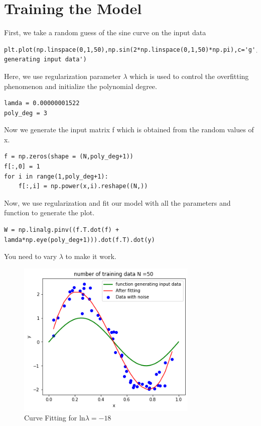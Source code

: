 \documentclass[journal,12pt,twocolumn]{IEEEtran}
\begin{document}
\section{Training the Model}
First, we take a random guess of the sine curve on the input data
\begin{lstlisting}
plt.plot(np.linspace(0,1,50),np.sin(2*np.linspace(0,1,50)*np.pi),c='g',linewidth=2,label='function generating input data')
\end{lstlisting} 
Here, we use regularization parameter $\lambda$ which is used to control the overfitting phenomenon and initialize the polynomial degree. 
\begin{lstlisting}
lamda = 0.00000001522 
poly_deg = 3
\end{lstlisting}
Now we generate the input matrix f which is obtained from the random values of x.
\begin{lstlisting}
f = np.zeros(shape = (N,poly_deg+1))
f[:,0] = 1
for i in range(1,poly_deg+1):
    f[:,i] = np.power(x,i).reshape((N,))    
\end{lstlisting}
Now, we use regularization and fit our model with all the parameters and function to generate the plot.
\begin{lstlisting}
W = np.linalg.pinv((f.T.dot(f) + lamda*np.eye(poly_deg+1))).dot(f.T).dot(y)
\end{lstlisting}
You need to vary $\lambda$ to make it work.
\begin{figure}[!h]
\begin{center}
\includegraphics[width=3.4in]{figs/fig2.png}
\end{center}
\caption{Curve Fitting for ln$\lambda = -18$}
\label{fig:2}
\end{figure}
\end{document}
